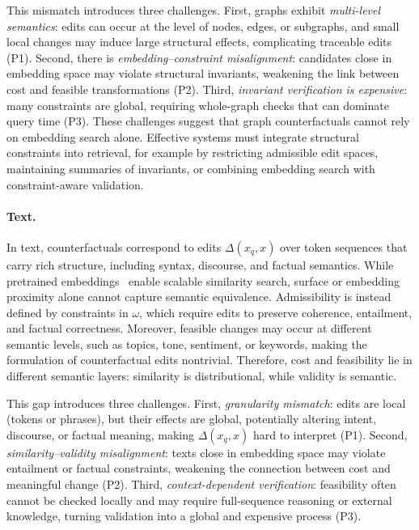 This mismatch introduces three challenges. First, graphs exhibit \emph{multi-level semantics}: edits can occur at the level of nodes, edges, or subgraphs, and small local changes may induce large structural effects, complicating traceable edits (P1). Second, there is \emph{embedding–constraint misalignment}: candidates close in embedding space may violate structural invariants, weakening the link between cost and feasible transformations (P2). Third, \emph{invariant verification is expensive}: many constraints are global, requiring whole-graph checks that can dominate query time (P3). These challenges suggest that graph counterfactuals cannot rely on embedding search alone. Effective systems must integrate structural constraints into retrieval, for example by restricting admissible edit spaces, maintaining summaries of invariants, or combining embedding search with constraint-aware validation.

\paragraph{Text.}
In text, counterfactuals correspond to edits $\Delta(x_q,x)$ over token sequences that carry rich structure, including syntax, discourse, and factual semantics. While pretrained embeddings~\cite{devlin2019bert} enable scalable similarity search, surface or embedding proximity alone cannot capture semantic equivalence. Admissibility is instead defined by constraints in $\omega$, which require edits to preserve coherence, entailment, and factual correctness. Moreover, feasible changes may occur at different semantic levels, such as topics, tone, sentiment, or keywords, making the formulation of counterfactual edits nontrivial. Therefore, cost and feasibility lie in different semantic layers: similarity is distributional, while validity is semantic.

This gap introduces three challenges. First, \emph{granularity mismatch}: edits are local (tokens or phrases), but their effects are global, potentially altering intent, discourse, or factual meaning, making $\Delta(x_q,x)$ hard to interpret (P1). Second, \emph{similarity--validity misalignment}: texts close in embedding space may violate entailment or factual constraints, weakening the connection between cost and meaningful change (P2). Third, \emph{context-dependent verification}: feasibility often cannot be checked locally and may require full-sequence reasoning or external knowledge, turning validation into a global and expensive process (P3).

